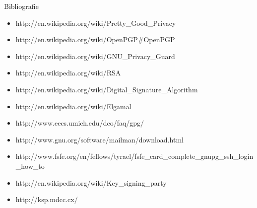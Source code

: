 \documentclass{beamer}
\begin{document}
\begin{frame}{Bibliografie}
  \begin{itemize}
    \item {}
    {http://en.wikipedia.org/wiki/Pretty\_Good\_Privacy}
    \item {} 
    {http://en.wikipedia.org/wiki/OpenPGP\#OpenPGP}
    \item {}
    {http://en.wikipedia.org/wiki/GNU\_Privacy\_Guard}
    \item {}
    {http://en.wikipedia.org/wiki/RSA}
    \item
    {http://en.wikipedia.org/wiki/Digital\_Signature\_Algorithm}
    \item {}
    {http://en.wikipedia.org/wiki/Elgamal}
    \item {}
    {http://www.eecs.umich.edu/dco/faq/gpg/}
    \item
    {http://www.gnu.org/software/mailman/download.html}
    \item
    {http://www.fsfe.org/en/fellows/tyrael/fsfe\_card\_complete\_gnupg\_ssh\_login\_how\_to}
    \item {}
    {http://en.wikipedia.org/wiki/Key\_signing\_party}
    \item {} {http://ksp.mdcc.cx/}
  \end{itemize}
\end{frame}
\end{document}
